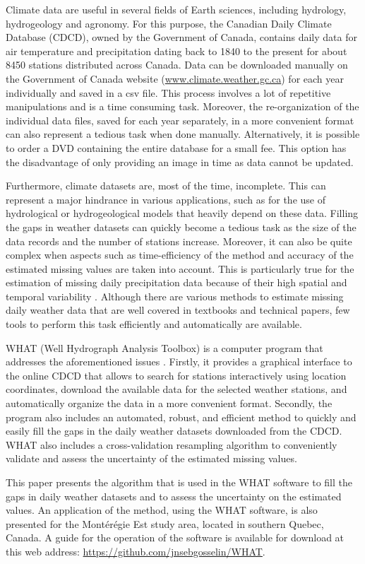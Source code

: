 \documentclass[TechnicalNoteMeteo.tex]{subfiles}
\begin{document}
Climate data are useful in several fields of Earth sciences, including hydrology, hydrogeology and agronomy. For this purpose, the Canadian Daily Climate Database (CDCD), owned by the Government of Canada, contains daily data for air temperature and precipitation dating back to 1840 to the present for about 8450 stations distributed across Canada. Data can be downloaded manually on the Government of Canada website (\url{www.climate.weather.gc.ca}) for each year individually and saved in a csv file. This process involves a lot of repetitive manipulations and is a time consuming task. Moreover, the re-organization of the individual data files, saved for each year separately, in a more convenient format can also represent a tedious task when done manually. Alternatively, it is possible to order a DVD containing the entire database for a small fee. This option has the disadvantage of only providing an image in time as data cannot be updated.  

Furthermore, climate datasets are, most of the time, incomplete. This can represent a major hindrance in various applications, such as for the use of hydrological or hydrogeological models that heavily depend on these data. Filling the gaps in weather datasets can quickly become a tedious task as the size of the data records and the number of stations increase. Moreover, it can also be quite complex when aspects such as time-efficiency of the method and accuracy of the estimated missing values are taken into account. This is particularly true for the estimation of missing daily precipitation data because of their high spatial and temporal variability \citep{simolo_improving_2010}. Although there are various methods to estimate missing daily weather data that are well covered in textbooks and technical papers, few tools to perform this task efficiently and automatically are available. 

WHAT (Well Hydrograph Analysis Toolbox) is a computer program that addresses the aforementioned issues \citep{gosselin_user_2015}. Firstly, it provides a graphical interface to the online CDCD that allows to search for stations interactively using location coordinates, download the available data for the selected weather stations, and automatically organize the data in a more convenient format. Secondly, the program also includes an automated, robust, and efficient method to quickly and easily fill the gaps in the daily weather datasets downloaded from the CDCD. WHAT also includes a cross-validation resampling algorithm to conveniently validate and assess the uncertainty of the estimated missing values.

This paper presents the algorithm that is used in the WHAT software to fill the gaps in daily weather datasets and to assess the uncertainty on the estimated values. An application of the method, using the WHAT software, is also presented for the Mont\'er\'egie Est study area, located in southern Quebec, Canada. A guide for the operation of the software \cite{gosselin_what_2015} is available for download at this web address:  \url{https://github.com/jnsebgosselin/WHAT}.
\end{document}
